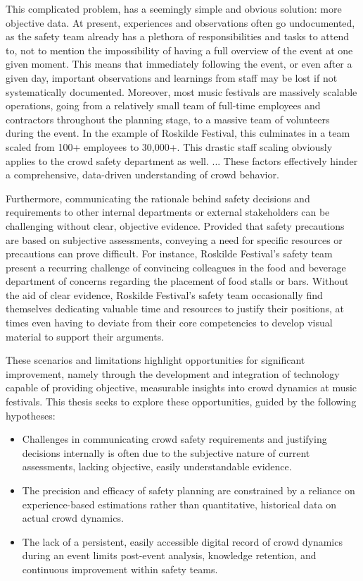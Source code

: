 This complicated problem, has a seemingly simple and obvious solution: more objective data. At present, experiences and observations often go undocumented, as the safety team already has a plethora of responsibilities and tasks to attend to, not to mention the impossibility of having a full overview of the event at one given moment. This means that immediately following the event, or even after a given day, important observations and learnings from staff may be lost if not systematically documented. Moreover, most music festivals are massively scalable operations, going from a relatively small team of full-time employees and contractors throughout the planning stage, to a massive team of volunteers during the event. In the example of Roskilde Festival, this culminates in a team scaled from 100+ employees to 30,000+. This drastic staff scaling obviously applies to the crowd safety department as well.
...
These factors effectively hinder a comprehensive, data-driven understanding of crowd behavior.

Furthermore, communicating the rationale behind safety decisions and requirements to other internal departments or external stakeholders can be challenging without clear, objective evidence. Provided that safety precautions are based on subjective assessments, conveying a need for specific resources or precautions can prove difficult. For instance, Roskilde Festival's safety team present a recurring challenge of convincing colleagues in the food and beverage department of concerns regarding the placement of food stalls or bars. Without the aid of clear evidence, Roskilde Festival's safety team occasionally find themselves dedicating valuable time and resources to justify their positions, at times even having to deviate from their core competencies to develop visual material to support their arguments.

These scenarios and limitations highlight opportunities for significant improvement, namely through the development and integration of technology capable of providing objective, measurable insights into crowd dynamics at music festivals. This thesis seeks to explore these opportunities, guided by the following hypotheses:

\begin{itemize}
  \item Challenges in communicating crowd safety requirements and justifying decisions internally is often due to the subjective nature of current assessments, lacking objective, easily understandable evidence.

  \item The precision and efficacy of safety planning are constrained by a reliance on experience-based estimations rather than quantitative, historical data on actual crowd dynamics.

  \item The lack of a persistent, easily accessible digital record of crowd dynamics during an event limits post-event analysis, knowledge retention, and continuous improvement within safety teams.
\end{itemize}

